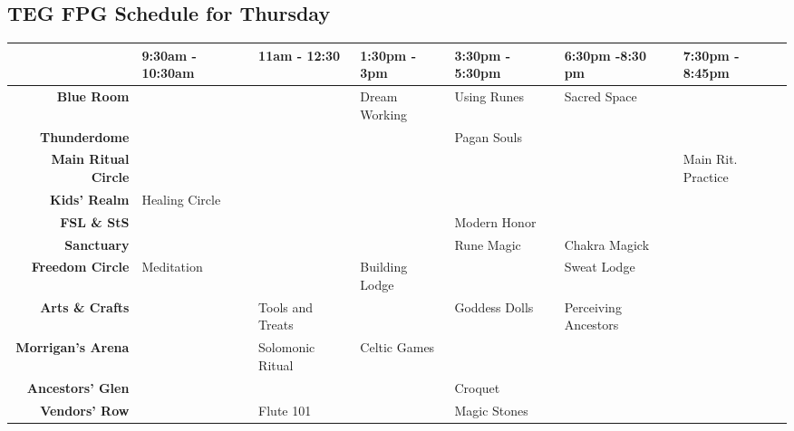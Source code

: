 
 \begin{center}
\section{TEG FPG Schedule for Thursday}

\begin{tabular}{|r|l|l|l|l|l|l|}
\hline
 & \textbf{9:30am - 10:30am} & \textbf{11am - 12:30} & \textbf{1:30pm - 3pm} & \textbf{3:30pm - 5:30pm} & \textbf{6:30pm -8:30 pm} & \textbf{7:30pm - 8:45pm} \\
\hline
\textbf{Blue Room} &  &  & Dream Working & Using Runes & Sacred Space &  \\
\hline
\textbf{Thunderdome} &  &  &  & Pagan Souls &  &  \\
\hline
\textbf{Main Ritual Circle} &  &  &  &  &  & Main Rit. Practice \\
\hline
\textbf{Kids' Realm} & Healing Circle &  &  &  &  &  \\
\hline
\textbf{FSL \& StS} &  &  &  & Modern Honor &  &  \\
\hline
\textbf{Sanctuary} &  &  &  & Rune Magic & Chakra Magick &  \\
\hline
\textbf{Freedom Circle} & Meditation &  & Building Lodge &  & Sweat Lodge &  \\
\hline
\textbf{Arts \& Crafts} &  & Tools and Treats &  & Goddess Dolls & Perceiving Ancestors &  \\
\hline
\textbf{Morrigan's Arena} &  & Solomonic Ritual & Celtic Games &  &  &  \\
\hline
\textbf{Ancestors' Glen} &  &  &  & Croquet &  &  \\
\hline
\textbf{Vendors' Row} &  & Flute 101 &  & Magic Stones &  &  \\
\hline
\end{tabular}
\end{center}